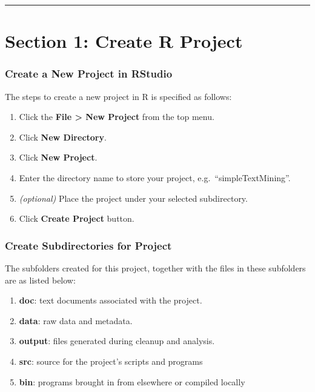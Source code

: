\documentclass[
]{article}
\providecommand{\tightlist}{%
  \setlength{\itemsep}{0pt}\setlength{\parskip}{0pt}}
\begin{document}
\begin{center}\rule{0.5\linewidth}{0.5pt}\end{center}

\hypertarget{section-1-create-r-project}{%
\section{Section 1: Create R Project}\label{section-1-create-r-project}}

\hypertarget{create-a-new-project-in-rstudio}{%
\subsubsection{Create a New Project in
RStudio}\label{create-a-new-project-in-rstudio}}

The steps to create a new project in R is specified as follows:

\begin{enumerate}
\def\labelenumi{\arabic{enumi}.}
\tightlist
\item
  Click the \textbf{File \textgreater{} New Project} from the top menu.
\item
  Click \textbf{New Directory}.
\item
  Click \textbf{New Project}.
\item
  Enter the directory name to store your project,
  e.g.~``simpleTextMining''.
\item
  \emph{(optional)} Place the project under your selected subdirectory.
\item
  Click \textbf{Create Project} button.
\end{enumerate}

\hypertarget{create-subdirectories-for-project}{%
\subsubsection{Create Subdirectories for
Project}\label{create-subdirectories-for-project}}

The subfolders created for this project, together with the files in
these subfolders are as listed below:

\begin{enumerate}
\def\labelenumi{\arabic{enumi}.}
\tightlist
\item
  \textbf{doc}: text documents associated with the project.
\item
  \textbf{data}: raw data and metadata.
\item
  \textbf{output}: files generated during cleanup and analysis.
\item
  \textbf{src}: source for the project's scripts and programs
\item
  \textbf{bin}: programs brought in from elsewhere or compiled locally
\end{enumerate}
\end{document}
